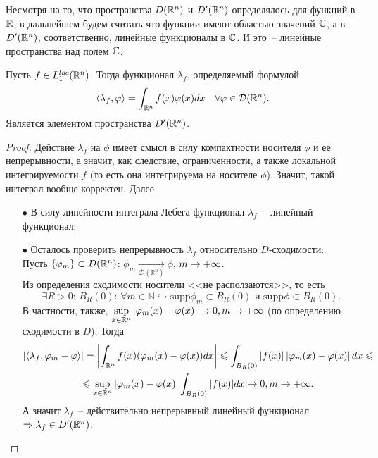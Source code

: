 
\begin{remark}
    Несмотря на то, что пространства $D(\mathbb{R}^n)$ и $D'(\mathbb{R}^n)$ определялось для функций в $\mathbb{R}$, в дальнейшем будем считать что функции имеют областью значений $\mathbb{C}$, а в $D'(\mathbb{R}^n)$, соответственно, линейные функционалы в $\mathbb{C}$.
    И это~-- линейные пространства над полем $\mathbb{C}$.
\end{remark}
\begin{lemma}
    Пусть $f \in L_1^{loc}(\mathbb{R}^n)$.
    Тогда функционал $\lambda_f$, определяемый формулой
    \[
        \langle \lambda_f, \varphi \rangle= \int_{\mathbb{R}^n} f(x) \varphi(x) dx \quad \forall \varphi \in \mathcal{D}(\mathbb{R}^n). \label{lambda_f_functional}
    \]
    Является элементом пространства $D'(\mathbb{R}^n)$.
\end{lemma}
\begin{proof}
    Действие $\lambda_f$ на $\phi$ имеет смысл в силу компактности носителя $\phi$ и ее непрерывности, а значит, как следствие, ограниченности, а также локальной интегрируемости $f$ (то есть она интегрируема на носителе $\phi$). Значит, такой интеграл вообще корректен. Далее
    \begin{enumerate}
        \item[$\bullet$] В силу линейности интеграла Лебега функционал $\lambda_f$~-- линейный функционал;
        \item[$\bullet$] Осталось проверить непрерывность $\lambda_f$ относительно $D$-сходимости: \\
        Пусть $\{\varphi_m\} \subset D(\mathbb{R}^n)$: $\phi_m \xrightarrow[\mathcal{D}(\mathbb{R}^n)]{} \phi$, $m \rightarrow +\infty$.\\
        Из определения сходимости носители <<не расползаются>>, то есть
        $$\exists R > 0\text{: } B_R(0) \text{: } \forall m \in \mathbb{N} \hookrightarrow \text{supp} \phi_m \subset B_R(0)  \text{ и supp} \phi \subset B_R(0).$$
        В частности, также, $\sup\limits_{x \in \mathbb{R}^n}|\varphi_m(x) - \varphi(x)| \rightarrow 0, m \rightarrow +\infty$ (по определению сходимости в $D$).
        Тогда
        \begin{multline*}
            |\langle \lambda_f, \varphi_m - \varphi \rangle | = \left|\int_{\mathbb{R}^n} f(x)(\varphi_m(x) - \varphi(x))dx\right| \leqslant \int_{B_R(0)} \left|f(x)\right|\left|\varphi_m(x) - \varphi(x)\right| dx \leqslant \\ \leqslant \sup\limits_{x \in \mathbb{R}^n} |\varphi_m (x) - \varphi (x)| \int_{B_R(0)} |f(x)|dx \rightarrow 0, m \rightarrow +\infty.
        \end{multline*}
        А значит $\lambda_f$~-- действительно непрерывный линейный функционал $\Rightarrow \lambda_f \in D'(\mathbb{R}^n)$.
    \end{enumerate}
\end{proof}

